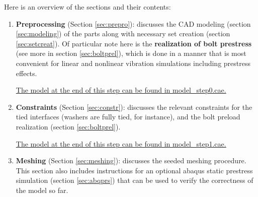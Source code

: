 \documentclass[11pt]{article}
\begin{document}
Here is an overview of the sections and their contents:
\begin{enumerate}
\item \textbf{Preprocessing} (Section \ref{sec:prepro}): discusses the CAD modeling (section \ref{sec:modeling}) of the parts along with necessary set creation (section \ref{sec:setcreat}). Of particular note here is the \textbf{realization of bolt prestress} (see more in section \ref{sec:boltprel}), which is done in a manner that is most convenient for linear and nonlinear vibration simulations including prestress effects.

\uline{The model at the end of this step can be found in \href{https://github.com/Nidish96/Abaqus4Joints/blob/main/assets/assembly/model\_step0.cae}{model\_step0.cae}.}
\item \textbf{Constraints} (Section \ref{sec:constr}): discusses the relevant constraints for the tied interfaces (washers are fully tied, for instance), and the bolt preload realization (section \ref{sec:boltprel}).

\uline{The model at the end of this step can be found in \href{https://github.com/Nidish96/Abaqus4Joints/blob/main/assets/assembly/model\_step1.cae}{model\_step1.cae}.}
\item \textbf{Meshing} (Section \ref{sec:meshing}): discusses the seeded meshing procedure. This section also includes instructions for an optional abaqus static prestress simulation (section \ref{sec:abqprs}) that can be used to verify the correctness of the model so far.


\end{enumerate}
\end{document}

